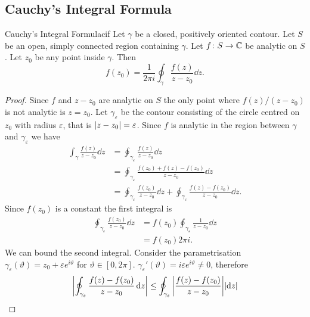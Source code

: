 \documentclass{article}
\begin{document}
    \subsection{Cauchy's Integral Formula}
    \begin{theorem}{Cauchy's Integral Formula}{cif}
        Let \(\gamma\) be a closed, positively oriented contour.
        Let \(S\) be an open, simply connected region containing \(\gamma\).
        Let \(f\colon S\to\mathbb{C}\) be analytic on \(S\).
        Let \(z_0\) be any point inside \(\gamma\).
        Then
        \[f(z_0) = \frac{1}{2\pi i} \oint_{\gamma} \frac{f(z)}{z - z_0} \dd{z}.\]
    \end{theorem}
    \begin{proof}
        Since \(f\) and \(z - z_0\) are analytic on \(S\) the only point where \(f(z)/(z - z_0)\) is not analytic is \(z = z_0\).
        Let \(\gamma_\varepsilon\) be the contour consisting of the circle centred on \(z_0\) with radius \(\varepsilon\), that is \(\abs{z - z_0} = \varepsilon\).
        Since \(f\) is analytic in the region between \(\gamma\) and \(\gamma_\varepsilon\) we have
        \begin{align*}
            \int_{\gamma} \frac{f(z)}{z - z_0} \dd{z} &= \oint_{\gamma_\varepsilon} \frac{f(z)}{z - z_0}\dd{z}\\
            &= \oint_{\gamma_\varepsilon} \frac{f(z_0) + f(z) - f(z_0)}{z - z_0}\dd{z}\\
            &= \oint_{\gamma_\varepsilon} \frac{f(z_0)}{z - z_0} \dd{z} + \oint_{\gamma_\varepsilon} \frac{f(z) - f(z_0)}{z - z_0}\dd{z}.
        \end{align*}
        Since \(f(z_0)\) is a constant the first integral is
        \begin{align*}
            \oint_{\gamma_\varepsilon} \frac{f(z_0)}{z - z_0} \dd{z} &= f(z_0) \oint_{\gamma_\varepsilon} \frac{1}{z - z_0}\dd{z}\\
            &= f(z_0) 2\pi i.
        \end{align*}
        We can bound the second integral.
        Consider the parametrisation \(\gamma_\varepsilon(\vartheta) = z_0 + \varepsilon e^{i\vartheta}\) for \(\vartheta\in[0, 2\pi]\).
        \(\gamma_\varepsilon'(\vartheta) = i\varepsilon e^{i\vartheta}\ne 0\), therefore
        \begin{align*}
            \abs{\oint_{\gamma_\varepsilon} \frac{f(z) - f(z_0)}{z - z_0}\dd{z}} &\le \oint_{\gamma
            _\varepsilon} \abs{\frac{f(z) - f(z_0)}{z - z_0}} \abs{\dd{z}}\\

\end{align*}
\end{proof}
\end{document}

